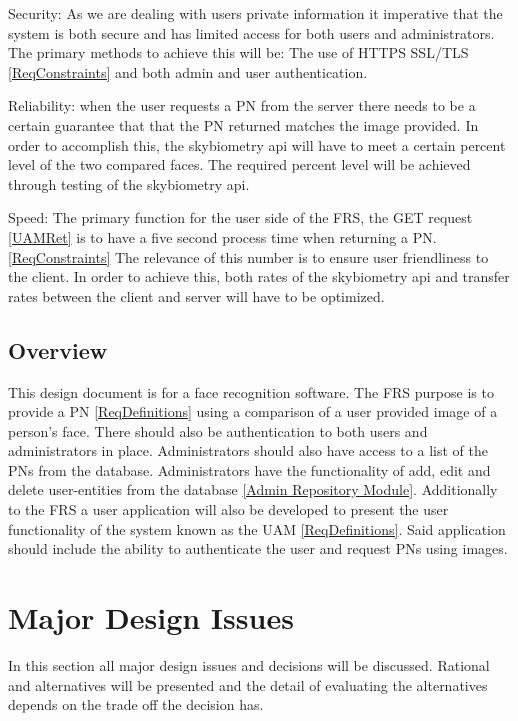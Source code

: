 \documentclass[a4paper,11pt]{article}
\begin{document}
Security: As we are dealing with users private information it imperative that the system is both secure and has limited access for both users and administrators. The primary methods to achieve this will be: The use of HTTPS SSL/TLS \ref{ReqConstraints}  and both admin and user authentication.

Reliability: when the user requests a PN from the server there needs to be a certain guarantee that that the PN returned matches the image provided. In order to accomplish this, the skybiometry api will have to meet a certain percent level of the two compared faces. The required percent level will be achieved through testing of the skybiometry api.

Speed: The primary function for the user side of the FRS, the GET request \ref{UAMRet} is to have a five second process time when returning a PN. \ref{ReqConstraints} The relevance of this number is to ensure user friendliness to the client.
In order to achieve this, both rates of the skybiometry api and transfer rates between the client and server will have to be optimized.

\subsection{Overview}
This design document is for a face recognition software. The FRS purpose is to provide a PN \ref{ReqDefinitions} using a comparison of a user provided image of a person's face. There should also be authentication to both users and administrators in place. Administrators should also have access to a list of the PNs from the database. Administrators have the functionality of add, edit and delete user-entities from the database \ref{Admin Repository Module}.
Additionally to the FRS a user application will also be developed to present the user functionality of the system known as the UAM \ref{ReqDefinitions}. Said application should include the ability to authenticate the user and request PNs using images.

\section{Major Design Issues} \label{Major_Design_Issues}
In this section all major design issues and decisions will be discussed. Rational and alternatives will be presented and the detail of evaluating the alternatives depends on the trade off the decision has.
\end{document}
